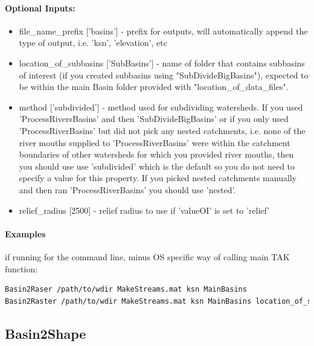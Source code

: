 \paragraph{Optional Inputs:}
\begin{itemize}
\item file\_name\_prefix ['basins'] - prefix for outputs, will automatically append the type of output, i.e. 'ksn', 'elevation', etc
\item location\_of\_subbasins ['SubBasins'] - name of folder that contains subbasins of interest (if you created subbasins using
"SubDivideBigBasins"), expected to be within the main Basin folder provided with "location\_of\_data\_files".
\item method ['subdivided'] - method used for subdividing watersheds. If you used 'ProcessRiversBasins' and then
'SubDivideBigBasins' or if you only used 'ProcessRiverBasins' but did not pick any nested catchments, i.e.
none of the river mouths supplied to 'ProcessRiverBasins' were within the catchment boundaries of other 
watersheds for which you provided river mouths, then you should use use 'subdivided' which is the default
so you do not need to specify a value for this property. If you picked nested catchments manually and then
ran 'ProcessRiverBasins' you should use 'nested'.
\item relief\_radius [2500] - relief radius to use if 'valueOI' is set to 'relief'
\end{itemize}

\paragraph{Examples} if running for the command line, minus OS specific way of calling main TAK function:

\begin{lstlisting}[language=bash]
Basin2Raser /path/to/wdir MakeStreams.mat ksn MainBasins
Basin2Raster /path/to/wdir MakeStreams.mat ksn MainBasins location_of_subbasins MySubbasins file_name_prefix Test
\end{lstlisting}

\subsection{Basin2Shape}

